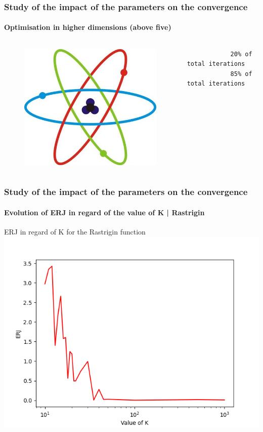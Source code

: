 \documentclass{beamer}
\begin{document}
	\begin{frame}[fragile]
	\frametitle{Study of the impact of the parameters on the convergence}
	\framesubtitle{Optimisation in higher dimensions (above five)}
		\begin{center}
		\begin{columns}
    		\column{4cm}
    			\begin{figure}
      				\centering
       				\includegraphics[scale=0.3]{dimension3.jpg}
			\end{figure}
		\column{5cm}
			\begin{verbatim}
			20% of total iterations
			85% of total iterations
			\end{verbatim}
		\end{columns}
		\end{center}
	\end{frame}
	\begin{frame}
	\frametitle{\color{velvet} Study of the impact of the parameters on the convergence}
	\framesubtitle{Evolution of ERJ in regard of the value of K | Rastrigin}
	ERJ in regard of K for the Rastrigin function
	\includegraphics[scale=0.5]{Graphs/7.png}
	\end{frame}
\end{document}
